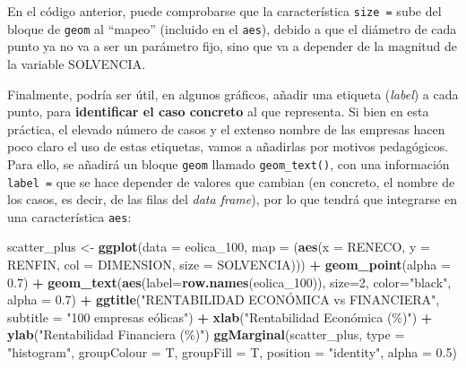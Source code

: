 \documentclass[
]{book}
\newenvironment{Shaded}{\begin{snugshade}}{\end{snugshade}}
\newcommand{\AttributeTok}[1]{\textcolor[rgb]{0.13,0.29,0.53}{#1}}
\newcommand{\DecValTok}[1]{\textcolor[rgb]{0.00,0.00,0.81}{#1}}
\newcommand{\FloatTok}[1]{\textcolor[rgb]{0.00,0.00,0.81}{#1}}
\newcommand{\FunctionTok}[1]{\textcolor[rgb]{0.13,0.29,0.53}{\textbf{#1}}}
\newcommand{\NormalTok}[1]{#1}
\newcommand{\OtherTok}[1]{\textcolor[rgb]{0.56,0.35,0.01}{#1}}
\newcommand{\SpecialCharTok}[1]{\textcolor[rgb]{0.81,0.36,0.00}{\textbf{#1}}}
\newcommand{\StringTok}[1]{\textcolor[rgb]{0.31,0.60,0.02}{#1}}
\begin{document}
En el código anterior, puede comprobarse que la característica \texttt{size\ =} sube del bloque de \texttt{geom} al ``mapeo'' (incluido en el \texttt{aes}), debido a que el diámetro de cada punto ya no va a ser un parámetro fijo, sino que va a depender de la magnitud de la variable SOLVENCIA.

Finalmente, podría ser útil, en algunos gráficos, añadir una etiqueta (\emph{label}) a cada punto, para \textbf{identificar el caso concreto} al que representa. Si bien en esta práctica, el elevado número de casos y el extenso nombre de las empresas hacen poco claro el uso de estas etiquetas, vamos a añadirlas por motivos pedagógicos. Para ello, se añadirá un bloque \texttt{geom} llamado \texttt{geom\_text()}, con una información \texttt{label\ =} que se hace depender de valores que cambian (en concreto, el nombre de los casos, es decir, de las filas del \emph{data frame}), por lo que tendrá que integrarse en una característica \texttt{aes}:

\begin{Shaded}
\begin{Highlighting}[]
\NormalTok{scatter\_plus }\OtherTok{\textless{}{-}} \FunctionTok{ggplot}\NormalTok{(}\AttributeTok{data =}\NormalTok{ eolica\_100, }\AttributeTok{map =}\NormalTok{ (}\FunctionTok{aes}\NormalTok{(}\AttributeTok{x =}\NormalTok{ RENECO,}
                                                     \AttributeTok{y =}\NormalTok{ RENFIN,}
                                                     \AttributeTok{col =}\NormalTok{ DIMENSION,}
                                                     \AttributeTok{size =}\NormalTok{ SOLVENCIA))) }\SpecialCharTok{+}
 \FunctionTok{geom\_point}\NormalTok{(}\AttributeTok{alpha =} \FloatTok{0.7}\NormalTok{) }\SpecialCharTok{+}
  \FunctionTok{geom\_text}\NormalTok{(}\FunctionTok{aes}\NormalTok{(}\AttributeTok{label=}\FunctionTok{row.names}\NormalTok{(eolica\_100)), }\AttributeTok{size=}\DecValTok{2}\NormalTok{, }\AttributeTok{color=}\StringTok{"black"}\NormalTok{, }\AttributeTok{alpha =} \FloatTok{0.7}\NormalTok{) }\SpecialCharTok{+}
  \FunctionTok{ggtitle}\NormalTok{(}\StringTok{"RENTABILIDAD ECONÓMICA vs FINANCIERA"}\NormalTok{,}
          \AttributeTok{subtitle =} \StringTok{"100 empresas eólicas"}\NormalTok{) }\SpecialCharTok{+}
  \FunctionTok{xlab}\NormalTok{(}\StringTok{"Rentabilidad Económica (\%)"}\NormalTok{) }\SpecialCharTok{+}
  \FunctionTok{ylab}\NormalTok{(}\StringTok{"Rentabilidad Financiera (\%)"}\NormalTok{)}
\FunctionTok{ggMarginal}\NormalTok{(scatter\_plus, }\AttributeTok{type =} \StringTok{"histogram"}\NormalTok{, }\AttributeTok{groupColour =}\NormalTok{ T,}
           \AttributeTok{groupFill =}\NormalTok{ T, }\AttributeTok{position =} \StringTok{"identity"}\NormalTok{, }\AttributeTok{alpha =} \FloatTok{0.5}\NormalTok{)}
\end{Highlighting}
\end{Shaded}
\end{document}
